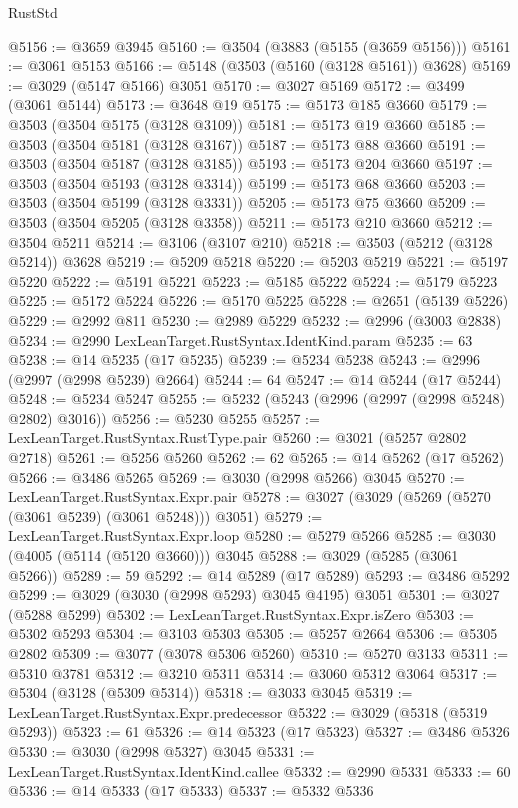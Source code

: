\begin{lexlean}{RustStd}
\begin{coremodule}
@5156 := @3659 @3945
@5160 := @3504 (@3883 (@5155 (@3659 @5156)))
@5161 := @3061 @5153
@5166 := @5148 (@3503 (@5160 (@3128 @5161)) @3628)
@5169 := @3029 (@5147 @5166) @3051
@5170 := @3027 @5169
@5172 := @3499 (@3061 @5144)
@5173 := @3648 @19
@5175 := @5173 @185 @3660
@5179 := @3503 (@3504 @5175 (@3128 @3109))
@5181 := @5173 @19 @3660
@5185 := @3503 (@3504 @5181 (@3128 @3167))
@5187 := @5173 @88 @3660
@5191 := @3503 (@3504 @5187 (@3128 @3185))
@5193 := @5173 @204 @3660
@5197 := @3503 (@3504 @5193 (@3128 @3314))
@5199 := @5173 @68 @3660
@5203 := @3503 (@3504 @5199 (@3128 @3331))
@5205 := @5173 @75 @3660
@5209 := @3503 (@3504 @5205 (@3128 @3358))
@5211 := @5173 @210 @3660
@5212 := @3504 @5211
@5214 := @3106 (@3107 @210)
@5218 := @3503 (@5212 (@3128 @5214)) @3628
@5219 := @5209 @5218
@5220 := @5203 @5219
@5221 := @5197 @5220
@5222 := @5191 @5221
@5223 := @5185 @5222
@5224 := @5179 @5223
@5225 := @5172 @5224
@5226 := @5170 @5225
@5228 := @2651 (@5139 @5226)
@5229 := @2992 @811
@5230 := @2989 @5229
@5232 := @2996 (@3003 @2838)
@5234 := @2990 LexLeanTarget.RustSyntax.IdentKind.param
@5235 := 63
@5238 := @14 @5235 (@17 @5235)
@5239 := @5234 @5238
@5243 := @2996 (@2997 (@2998 @5239) @2664)
@5244 := 64
@5247 := @14 @5244 (@17 @5244)
@5248 := @5234 @5247
@5255 := @5232 (@5243 (@2996 (@2997 (@2998 @5248) @2802) @3016))
@5256 := @5230 @5255
@5257 := LexLeanTarget.RustSyntax.RustType.pair
@5260 := @3021 (@5257 @2802 @2718)
@5261 := @5256 @5260
@5262 := 62
@5265 := @14 @5262 (@17 @5262)
@5266 := @3486 @5265
@5269 := @3030 (@2998 @5266) @3045
@5270 := LexLeanTarget.RustSyntax.Expr.pair
@5278 := @3027 (@3029 (@5269 (@5270 (@3061 @5239) (@3061 @5248))) @3051)
@5279 := LexLeanTarget.RustSyntax.Expr.loop
@5280 := @5279 @5266
@5285 := @3030 (@4005 (@5114 (@5120 @3660))) @3045
@5288 := @3029 (@5285 (@3061 @5266))
@5289 := 59
@5292 := @14 @5289 (@17 @5289)
@5293 := @3486 @5292
@5299 := @3029 (@3030 (@2998 @5293) @3045 @4195) @3051
@5301 := @3027 (@5288 @5299)
@5302 := LexLeanTarget.RustSyntax.Expr.isZero
@5303 := @5302 @5293
@5304 := @3103 @5303
@5305 := @5257 @2664
@5306 := @5305 @2802
@5309 := @3077 (@3078 @5306 @5260)
@5310 := @5270 @3133
@5311 := @5310 @3781
@5312 := @3210 @5311
@5314 := @3060 @5312 @3064
@5317 := @5304 (@3128 (@5309 @5314))
@5318 := @3033 @3045
@5319 := LexLeanTarget.RustSyntax.Expr.predecessor
@5322 := @3029 (@5318 (@5319 @5293))
@5323 := 61
@5326 := @14 @5323 (@17 @5323)
@5327 := @3486 @5326
@5330 := @3030 (@2998 @5327) @3045
@5331 := LexLeanTarget.RustSyntax.IdentKind.callee
@5332 := @2990 @5331
@5333 := 60
@5336 := @14 @5333 (@17 @5333)
@5337 := @5332 @5336

\end{coremodule}
\end{lexlean}
